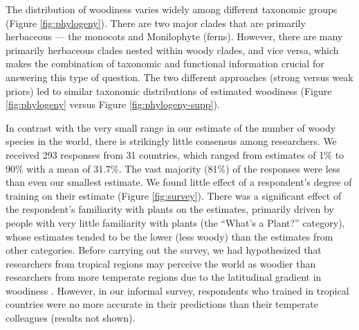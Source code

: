 \documentclass[12pt]{article}
\begin{document}

The distribution of woodiness varies widely among different taxonomic
groups (Figure \ref{fig:phylogeny}).  There are two major clades that
are primarily herbaceous --- the monocots and Monilophyte (ferns).
However, there are many primarily herbaceous clades nested within
woody clades, and vice versa, which makes the combination of taxonomic and functional information crucial for answering this type of question.  The two different approaches (strong versus weak priors) led to similar taxonomic distributions of estimated woodiness (Figure \ref{fig:phylogeny} versus Figure \ref{fig:phylogeny-supp}).  

In contrast with the very small range in our estimate of the number of
woody species in the world, there is strikingly little consensus among
researchers.  We received 293 responses from 31 countries, which
ranged from estimates of 1\% to 90\% with a mean of 31.7\%.  The vast
majority (81\%) of the responses were less than even our smallest
estimate.
We found little effect of a respondent's degree of training on their
estimate (Figure \ref{fig:survey}).  There was a significant effect of
the respondent's familiarity with plants on the estimates, primarily
driven by people with very little familiarity with plants (the
``What's a Plant?'' category), whose estimates tended to be the lower
(less woody) than the estimates from other categories.
% 
Before carrying out the survey, we had hypothesized that researchers
from tropical regions may perceive the world as woodier than
researchers from more temperate regions due to the latitudinal
gradient in woodiness \citep{Molesheihgt}.  However, in our informal
survey, respondents who trained in tropical countries were no more
accurate in their predictions than their temperate colleagues (results
not shown).
\end{document}
